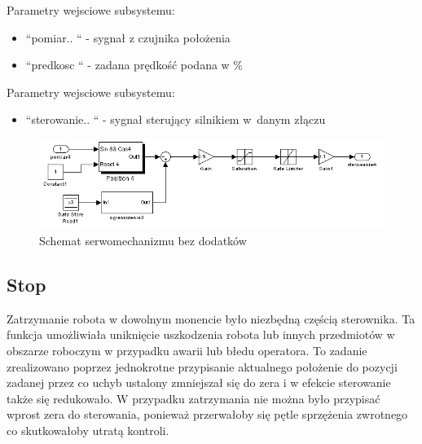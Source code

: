 \noindent Parametry wejsciowe subsystemu:
\begin{itemize}
\item``pomiar.. `` - sygnał z czujnika położenia
\item ``predkosc `` - zadana prędkość podana w \%
\end{itemize}
\noindent Parametry wejsciowe subsystemu:
\begin{itemize}
\item ``sterowanie.. `` - sygnał sterujący silnikiem w~danym złączu 
\end{itemize}

\begin{figure}
\centering
\includegraphics[width=16cm] {dodatki/bez_dodatkow2_wyciete.jpg}
\caption{Schemat serwomechanizmu bez dodatków}
\label{fig:bez_dodatkow2_wyciete}
\end{figure}

\subsection{Stop}
\label{subsec:Stop}

Zatrzymanie robota w dowolnym monencie było niezbędną częścią sterownika. Ta funkcja umożliwiała uniknięcie uszkodzenia robota lub innych przedmiotów w obszarze roboczym w przypadku awarii lub błedu operatora. To zadanie zrealizowano poprzez jednokrotne przypisanie aktualnego położenie do pozycji zadanej przez co uchyb ustalony zmniejszał się do zera i w efekcie sterowanie także się redukowało. W przypadku zatrzymania nie można było przypisać wprost zera do sterowania, ponieważ przerwałoby się pętle sprzężenia zwrotnego co skutkowałoby utratą kontroli.

